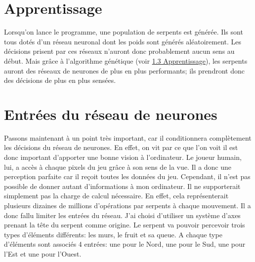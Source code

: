 \documentclass[12pt, a4paper, openany]{book}
\begin{document}
\section{Apprentissage}
Lorsqu'on lance le programme, une population de serpents est générée. Ils sont tous dotés d'un réseau neuronal dont les poids sont générés aléatoirement. Les décisions \og{}prisent\fg{} par ces réseaux n'auront donc probablement aucun sens au début. Mais grâce à l'algorithme génétique (voir \hyperref[r:1.3]{1.3 Apprentissage}), les serpents auront des réseaux de neurones de plus en plus performants; ils prendront donc des décisions de plus en plus sensées.

\section{Entrées du réseau de neurones}
\label{r:2.5}
Passons maintenant à un point très important, car il conditionnera complètement les décisions du réseau de neurones. En effet, \og{}on vit par ce que l'on voit\fg{} il est donc important d'apporter une bonne \og{}vision\fg{} à l'ordinateur. Le joueur humain, lui, a accès à chaque pixels du jeu grâce à son sens de la vue. Il a donc une perception parfaite car il reçoit toutes les données du jeu. Cependant, il n'est pas possible de donner autant d'informations à mon ordinateur. Il ne supporterait simplement pas la charge de calcul nécessaire. En effet, cela représenterait plusieurs dizaines de millions d'opérations par serpents à chaque mouvement. Il a donc fallu limiter les entrées du réseau. J'ai choisi d'utiliser un système d'axes prenant la tête du serpent comme origine. Le serpent va pouvoir percevoir trois types d'éléments différents: les murs, le fruit et sa queue.  A chaque type d'éléments sont associés 4 entrées: une pour le Nord, une pour le Sud, une pour l'Est et une pour l'Ouest.
\end{document}
